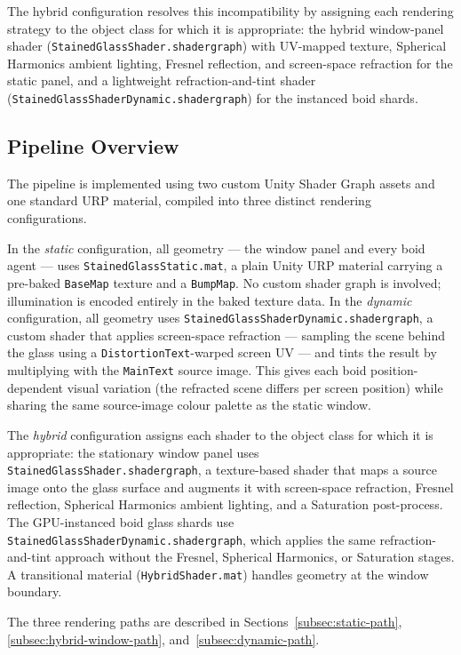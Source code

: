 \documentclass[12pt]{article}
\begin{document}
The hybrid configuration resolves this incompatibility by assigning each rendering strategy to the object class for which it is appropriate: the hybrid window-panel shader (\texttt{StainedGlassShader.shadergraph}) with UV-mapped texture, Spherical Harmonics ambient lighting, Fresnel reflection, and screen-space refraction for the static panel, and a lightweight refraction-and-tint shader (\texttt{StainedGlassShaderDynamic.shadergraph}) for the instanced boid shards.

\subsection{Pipeline Overview}
\label{subsec:hybrid-strategy}

The pipeline is implemented using two custom Unity Shader Graph assets and one standard URP material, compiled into three distinct rendering configurations.

In the \emph{static} configuration, all geometry --- the window panel and every boid agent --- uses \texttt{StainedGlassStatic.mat}, a plain Unity URP material carrying a pre-baked \texttt{BaseMap} texture and a \texttt{BumpMap}. No custom shader graph is involved; illumination is encoded entirely in the baked texture data. In the \emph{dynamic} configuration, all geometry uses \texttt{StainedGlassShaderDynamic.shadergraph}, a custom shader that applies screen-space refraction --- sampling the scene behind the glass using a \texttt{DistortionText}-warped screen UV --- and tints the result by multiplying with the \texttt{MainText} source image. This gives each boid position-dependent visual variation (the refracted scene differs per screen position) while sharing the same source-image colour palette as the static window.

The \emph{hybrid} configuration assigns each shader to the object class for which it is appropriate: the stationary window panel uses \texttt{StainedGlassShader.shadergraph}, a texture-based shader that maps a source image onto the glass surface and augments it with screen-space refraction, Fresnel reflection, Spherical Harmonics ambient lighting, and a Saturation post-process. The GPU-instanced boid glass shards use \texttt{StainedGlassShaderDynamic.shadergraph}, which applies the same refraction-and-tint approach without the Fresnel, Spherical Harmonics, or Saturation stages. A transitional material (\texttt{HybridShader.mat}) handles geometry at the window boundary.

The three rendering paths are described in Sections~\ref{subsec:static-path}, \ref{subsec:hybrid-window-path}, and~\ref{subsec:dynamic-path}.
\end{document}
